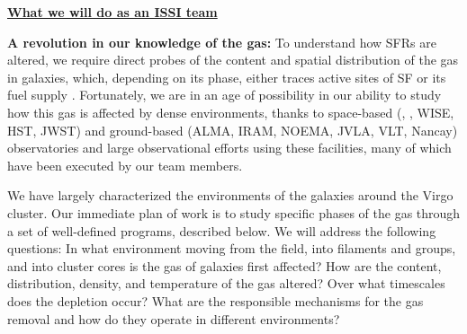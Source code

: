 \documentclass[11pt]{article}
\begin{document}
\centerline{{\bf \underline{ What we will do as an ISSI team}}}

\textbf{A revolution in our knowledge of the gas:} To understand how SFRs are altered, we require direct probes of the content and spatial distribution of the gas in galaxies, which, depending on its phase, either traces active sites of SF or its fuel supply  \citep[e.g.][]{Kennicutt98b,Bigiel08}.  Fortunately, we are in an age of possibility in our ability to study how this gas is affected by dense environments, thanks to space-based (\spitzer, \herschel, WISE, HST, JWST) and ground-based (ALMA, IRAM, NOEMA, JVLA, VLT, Nancay) observatories and large observational efforts using these facilities, many of which have been executed by our team members.

We have largely characterized the environments of the galaxies around the Virgo cluster. Our immediate plan of work is to study specific phases of the gas through a set of well-defined programs, described below.   We will address the following questions: In what environment moving from the field, into filaments and groups, and into cluster cores is the gas of galaxies first affected?  How are the content, distribution, density, and temperature of the gas altered?  Over what timescales does the depletion occur?  What are the responsible mechanisms for the gas removal and how do they operate in different environments?  



\end{document}
